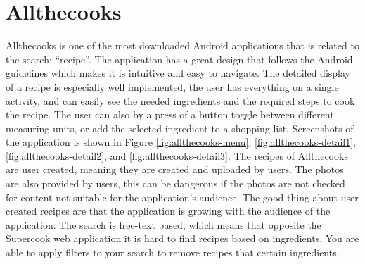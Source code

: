 \section{Allthecooks}
Allthecooks is one of the most downloaded \cite{allthecooks-googleplay} Android applications that is related to the search: ``recipe''. The application has a great design that follows the Android guidelines\cite{guidelines-appstructure} which makes it is intuitive and easy to navigate. The detailed display of a recipe is especially well implemented, the user has everything on a single activity, and can easily see the needed ingredients and the required steps to cook the recipe. The user can also by a press of a button toggle between different measuring units, or add the selected ingredient to a shopping list. Screenshots of the application is shown in Figure \ref{fig:allthecooks-menu}, \ref{fig:allthecooks-detail1}, \ref{fig:allthecooks-detail2}, and \ref{fig:allthecooks-detail3}. 
The recipes of Allthecooks are user created, meaning they are created and uploaded by users. The photos are also provided by users, this can be dangerous if the photos are not checked for content not suitable for the application's audience. The good thing about user created recipes are that the application is growing with the audience of the application.
The search is free-text based, which means that opposite the Supercook web application it is hard to find recipes based on ingredients. You are able to apply filters to your search to remove recipes that certain ingredients.

